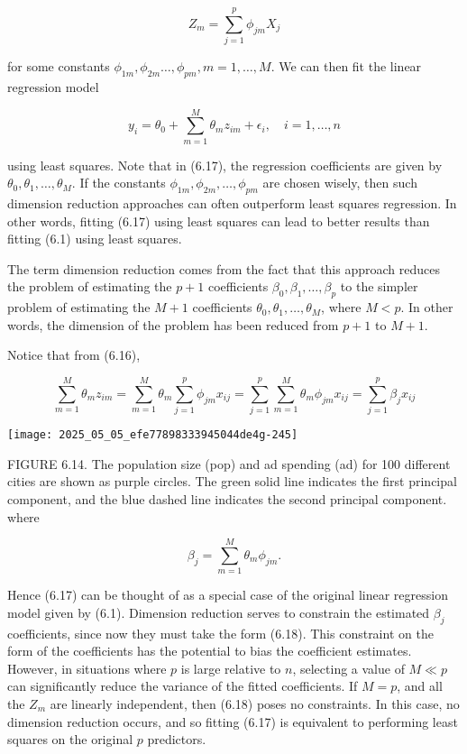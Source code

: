 \documentclass[10pt]{article}
\begin{document}
\begin{equation*}
Z_{m}=\sum_{j=1}^{p} \phi_{j m} X_{j} \tag{6.16}
\end{equation*}


for some constants $\phi_{1 m}, \phi_{2 m} \ldots, \phi_{p m}, m=1, \ldots, M$. We can then fit the linear regression model


\begin{equation*}
y_{i}=\theta_{0}+\sum_{m=1}^{M} \theta_{m} z_{i m}+\epsilon_{i}, \quad i=1, \ldots, n \tag{6.17}
\end{equation*}


using least squares. Note that in (6.17), the regression coefficients are given by $\theta_{0}, \theta_{1}, \ldots, \theta_{M}$. If the constants $\phi_{1 m}, \phi_{2 m}, \ldots, \phi_{p m}$ are chosen wisely, then such dimension reduction approaches can often outperform least squares regression. In other words, fitting (6.17) using least squares can lead to better results than fitting (6.1) using least squares.

The term dimension reduction comes from the fact that this approach reduces the problem of estimating the $p+1$ coefficients $\beta_{0}, \beta_{1}, \ldots, \beta_{p}$ to the simpler problem of estimating the $M+1$ coefficients $\theta_{0}, \theta_{1}, \ldots, \theta_{M}$, where $M<p$. In other words, the dimension of the problem has been reduced from $p+1$ to $M+1$.

Notice that from (6.16),

$$
\sum_{m=1}^{M} \theta_{m} z_{i m}=\sum_{m=1}^{M} \theta_{m} \sum_{j=1}^{p} \phi_{j m} x_{i j}=\sum_{j=1}^{p} \sum_{m=1}^{M} \theta_{m} \phi_{j m} x_{i j}=\sum_{j=1}^{p} \beta_{j} x_{i j}
$$

\begin{center}
\texttt{[image: 2025\_05\_05\_efe77898333945044de4g-245]}
\end{center}

FIGURE 6.14. The population size (pop) and ad spending (ad) for 100 different cities are shown as purple circles. The green solid line indicates the first principal component, and the blue dashed line indicates the second principal component.\\
where


\begin{equation*}
\beta_{j}=\sum_{m=1}^{M} \theta_{m} \phi_{j m} . \tag{6.18}
\end{equation*}


Hence (6.17) can be thought of as a special case of the original linear regression model given by (6.1). Dimension reduction serves to constrain the estimated $\beta_{j}$ coefficients, since now they must take the form (6.18). This constraint on the form of the coefficients has the potential to bias the coefficient estimates. However, in situations where $p$ is large relative to $n$, selecting a value of $M \ll p$ can significantly reduce the variance of the fitted coefficients. If $M=p$, and all the $Z_{m}$ are linearly independent, then (6.18) poses no constraints. In this case, no dimension reduction occurs, and so fitting (6.17) is equivalent to performing least squares on the original $p$ predictors.
\end{document}
